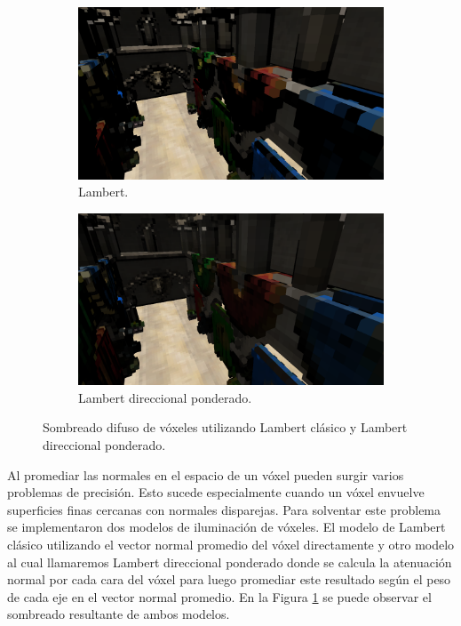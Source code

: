 \begin{figure}[H]
	\centering
	\begin{subfigure}[t]{0.49\textwidth}
		\centering
		\captionsetup{justification=centering}
		\includegraphics[width=\linewidth]{media/classic_lambert.png}
		\caption*{Lambert.}
	\end{subfigure}%
	\hspace{0.01\textwidth}
	\begin{subfigure}[t]{0.49\textwidth}
		\centering
		\captionsetup{justification=centering}
		\includegraphics[width=\linewidth]{media/dir_lambert.png}
		\caption*{Lambert direccional ponderado.}
	\end{subfigure}%
	\caption{Sombreado difuso de vóxeles utilizando Lambert clásico y Lambert direccional ponderado.}
	\label{fig:lambert_dir_diff}
\end{figure}

Al promediar las normales en el espacio de un vóxel pueden surgir varios problemas de precisión. Esto sucede especialmente cuando un vóxel envuelve superficies finas cercanas con normales disparejas. Para solventar este problema se implementaron dos modelos de iluminación de vóxeles. El modelo de Lambert clásico utilizando el vector normal promedio del vóxel directamente y otro modelo al cual llamaremos Lambert direccional ponderado donde se calcula la atenuación normal por cada cara del vóxel para luego promediar este resultado según el peso de cada eje en el vector normal promedio. En la Figura \ref{fig:lambert_dir_diff} se puede observar el sombreado resultante de ambos modelos.

